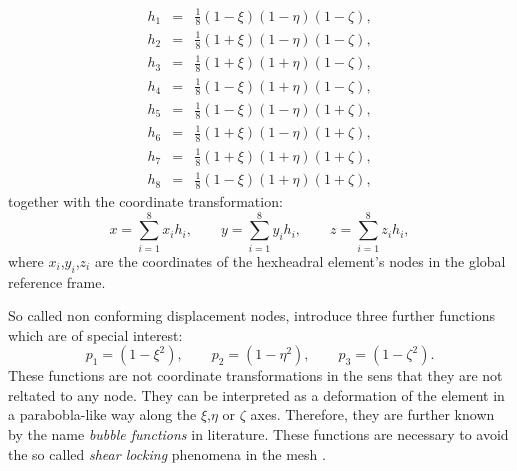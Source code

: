 \begin{eqnarray}
  h_1 &=& \frac{1}{8}(1-\xi)(1-\eta)(1-\zeta), \nonumber \\
  h_2 &=& \frac{1}{8}(1+\xi)(1-\eta)(1-\zeta), \nonumber \\
  h_3 &=& \frac{1}{8}(1+\xi)(1+\eta)(1-\zeta), \nonumber \\
  h_4 &=& \frac{1}{8}(1-\xi)(1+\eta)(1-\zeta), \nonumber \\
  h_5 &=& \frac{1}{8}(1-\xi)(1-\eta)(1+\zeta), \nonumber \\
  h_6 &=& \frac{1}{8}(1+\xi)(1-\eta)(1+\zeta), \nonumber \\
  h_7 &=& \frac{1}{8}(1+\xi)(1+\eta)(1+\zeta), \nonumber \\
  h_8 &=& \frac{1}{8}(1-\xi)(1+\eta)(1+\zeta),
  \label{eqn-shape}
\end{eqnarray}
together with the coordinate transformation:
\begin{equation}
  x = \sum_{i=1}^8x_ih_i,\qquad y = \sum_{i=1}^8y_ih_i, \qquad z =
  \sum_{i=1}^8z_ih_i,
  \label{eqn-cotrans}
\end{equation}
where $x_i$,$y_i$,$z_i$ are the coordinates of the hexheadral element's
nodes in the global reference frame.  

So called non conforming displacement nodes, introduce three further
functions which are of special interest:
\begin{equation}
  p_1 = (1-\xi^2),\qquad 
  p_2 = (1-\eta^2),\qquad 
  p_3 = (1-\zeta^2).
  \label{eqn-bubble}
\end{equation}
These functions are not coordinate transformations in the sens that they are not
reltated to any node. They can be interpreted as a deformation of the element in
a parabobla-like way along the $\xi$,$\eta$ or $\zeta$ axes. Therefore, they are
further known by the name \emph{bubble functions} in literature.
These functions are necessary to avoid the so called \emph{shear locking}
phenomena in the mesh \cite{incomp1}.

